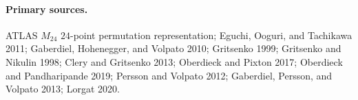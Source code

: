 \paragraph{Primary sources.}
ATLAS \(M_{24}\) \(24\)-point permutation representation; Eguchi,
Ooguri, and Tachikawa 2011; Gaberdiel, Hohenegger, and Volpato 2010;
Gritsenko 1999; Gritsenko and Nikulin 1998; Clery and Gritsenko 2013;
Oberdieck and Pixton 2017; Oberdieck and Pandharipande 2019; Persson
and Volpato 2012; Gaberdiel, Persson, and Volpato 2013; Lorgat 2020.
